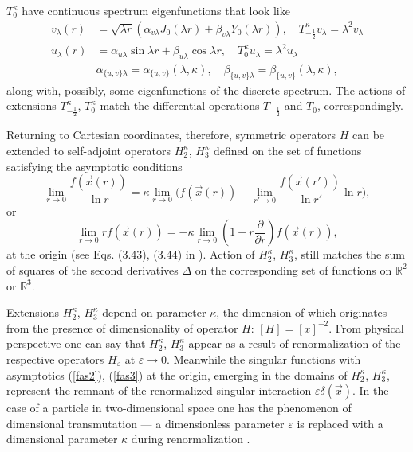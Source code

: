 \documentclass[12pt]{article}
\newcommand{\RR}{\mathbb{R}}
\newcommand{\ve}{\varepsilon}
\begin{document}
$ T_{0}^{\kappa} $
	have continuous spectrum eigenfunctions that look like
\begin{align*}
    v_{\lambda}(r) &= \sqrt{\lambda r} (\alpha_{v\lambda} J_{0}(\lambda r)
	+ \beta_{v\lambda} Y_{0}(\lambda r)) , 
    \quad T_{-\frac{1}{2}}^{\kappa} v_{\lambda} = \lambda^{2} v_{\lambda}\\
    u_{\lambda}(r) &= \alpha_{u\lambda} \sin \lambda r
	+ \beta_{u\lambda} \cos\lambda r , 
    \quad T_{0}^{\kappa} u_{\lambda} = \lambda^{2} u_{\lambda}\\
    &\alpha_{\{u,v\}\lambda} = \alpha_{\{u,v\}}(\lambda,\kappa), \quad
    \beta_{\{u,v\}\lambda} = \beta_{\{u,v\}}(\lambda,\kappa),
\end{align*}
	along with, possibly, some eigenfunctions of the discrete spectrum.
	The actions of extensions
$ T_{-\frac{1}{2}}^{\kappa} $,
$ T_{0}^{\kappa} $
	match the differential operations
$ T_{-\frac{1}{2}} $ and
$ T_{0} $, correspondingly.

	Returning to Cartesian coordinates, therefore, symmetric operators
$ H $
	can be extended to self-adjoint operators
$ H_{2}^{\kappa} $, 
$ H_{3}^{\kappa} $
	defined on the set of functions satisfying the asymptotic conditions
\begin{equation}
\label{fas2}
    \lim_{r\to 0} \frac{f(\vec{x}(r))}{\ln r} = \kappa \lim_{r\to 0}\bigl(
	f(\vec{x}(r)) -\lim_{r'\to 0} \frac{f(\vec{x}(r'))}{\ln r'} \ln r
    \bigr) ,
\end{equation}
	or
\begin{equation}
\label{fas3}
    \lim_{r\to 0} rf(\vec{x}(r)) = -\kappa \lim_{r\to 0}(
	1 + r \frac{\partial}{\partial r} ) f(\vec{x}(r)) ,
\end{equation}
	at the origin
    (see Eqs. (3.43), (3.44) in
\cite{Jackiw}).
	Action of 
$ H_{2}^{\kappa} $,
$ H_{3}^{\kappa} $,
	still matches the sum of squares of the second derivatives
$ \Delta $ on the corresponding set of functions on
$ \RR^{2} $ or
$ \RR^{3} $.

	Extensions
$ H_{2}^{\kappa} $,
$ H_{3}^{\kappa} $
	depend on parameter
$ \kappa $,
	the dimension of which originates from the presence of dimensionality of operator
$ H $:
$ [H] = [x]^{-2} $.
	From physical perspective one can say that
$ H_{2}^{\kappa} $,
$ H_{3}^{\kappa} $
	appear as a result of renormalization of the respective operators
$ H_{\ve} $
	at
$ \ve \to 0 $.
    Meanwhile the singular functions with asymptotics
(\ref{fas2}),
(\ref{fas3})
	at the origin, emerging in the domains of
$ H_{2}^{\kappa} $,
$ H_{3}^{\kappa} $,
    represent the remnant of the
	renormalized singular interaction
$ \ve \delta(\vec{x}) $.
	In the case of a particle in two-dimensional space one
	has the phenomenon of dimensional transmutation ---
	a dimensionless parameter
$ \ve $
	is replaced with a dimensional parameter
$ \kappa $
	during renormalization
\cite{LFres}.
\end{document}

